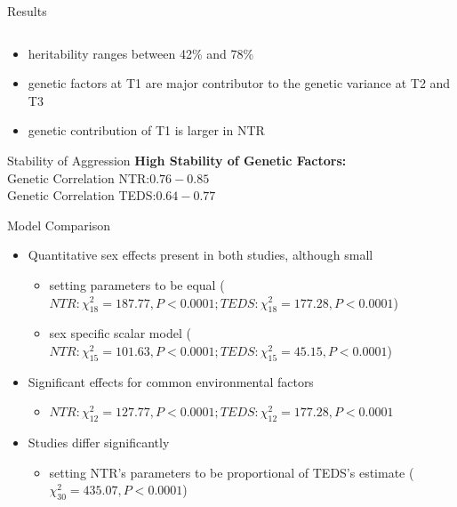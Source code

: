 \documentclass{beamer}
\begin{document}
\begin{frame}[t]{Results}
\begin{columns}
\begin{column}{0.5\textwidth}
\begin{center}
      \end{center} 
    \end{column}
  \end{columns}
  \begin{itemize}
    \item heritability ranges between 42\% and 78\%
    \item genetic factors at T1 are major contributor to the genetic
      variance at T2 and T3
    \item genetic contribution of T1 is larger in NTR
  \end{itemize}
\end{frame}

\begin{frame}[t]{Stability of Aggression}
  \textbf{High Stability of Genetic Factors:} \\
  Genetic Correlation NTR:\@ $0.76-0.85$ \\
  Genetic Correlation TEDS:\@ $0.64-0.77$ \\
  \vfill
\end{frame}

\begin{frame}[t]{Model Comparison}
  \begin{itemize}
    \item Quantitative sex effects present in both studies, although small
      \begin{itemize}
        \item setting parameters to be equal ($NTR: \chi^2_{18}=187.77, P< 0.0001; TEDS: \chi^2_{18}=177.28, P<0.0001$) 
        \item sex specific scalar model  ($NTR: \chi^2_{15}=101.63, P< 0.0001; TEDS: \chi^2_{15}=45.15, P<0.0001$)
      \end{itemize}
    \item Significant effects for common environmental factors
      \begin{itemize}
        \item $NTR: \chi^2_{12}=127.77, P<0.0001; TEDS: \chi^2_{12}=177.28, P<0.0001$
      \end{itemize}
    \item Studies differ significantly
      \begin{itemize}
        \item setting NTR's parameters to be proportional of TEDS's estimate ($\chi^2_{30}=435.07, P< 0.0001$)
      \end{itemize}
  \end{itemize}
\end{frame}
\end{document}
